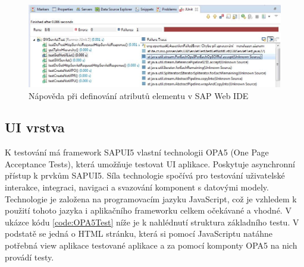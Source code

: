 \documentclass[thesis=M,czech]{FITthesis}[2012/06/26]
\begin{document}
\begin{figure}[H]
	\centering
	\includegraphics[width=1\textwidth]{images/unit_test_error}
	\caption{Nápověda při definování atributů elementu v SAP Web IDE}
	\label{img:unit_test_error}
\end{figure}

\subsection{UI vrstva}
K testování má framework SAPUI5 vlastní technologii OPA5 (One Page Acceptance Tests), která umožňuje testovat UI aplikace. Poskytuje asynchronní přístup k prvkům SAPUI5. Síla technologie spočívá pro testování uživatelské interakce, integraci, navigaci a svazování komponent s datovými modely. Technologie je založena na programovacím jazyku JavaScript, což je vzhledem k použití tohoto jazyka i aplikačního frameworku celkem očekávané a vhodné. V ukázce kódu \ref{code:OPA5Test} níže je k nahlédnutí struktura základního testu. V podstatě se jedná o HTML stránku, která si pomocí JavaScriptu natáhne potřebná view aplikace testované aplikace a za pomocí komponty OPA5 na nich provádí testy.
\end{document}
